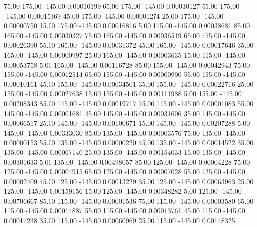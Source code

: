      75.00    175.00   -145.00     0.00016199
     65.00    175.00   -145.00     0.00030127
     55.00    175.00   -145.00     0.00015369
     45.00    175.00   -145.00     0.00001274
     25.00    175.00   -145.00     0.00000750
     15.00    175.00   -145.00     0.00016816
      5.00    175.00   -145.00     0.00038681
     85.00    165.00   -145.00     0.00030327
     75.00    165.00   -145.00     0.00036519
     65.00    165.00   -145.00     0.00026390
     55.00    165.00   -145.00     0.00031372
     45.00    165.00   -145.00     0.00017646
     35.00    165.00   -145.00     0.00000997
     25.00    165.00   -145.00     0.00003635
     15.00    165.00   -145.00     0.00053758
      5.00    165.00   -145.00     0.00116728
     85.00    155.00   -145.00     0.00042943
     75.00    155.00   -145.00     0.00012514
     65.00    155.00   -145.00     0.00000990
     55.00    155.00   -145.00     0.00010161
     45.00    155.00   -145.00     0.00034501
     35.00    155.00   -145.00     0.00022716
     25.00    155.00   -145.00     0.00027638
     15.00    155.00   -145.00     0.00111988
      5.00    155.00   -145.00     0.00208343
     85.00    145.00   -145.00     0.00019717
     75.00    145.00   -145.00     0.00001083
     55.00    145.00   -145.00     0.00001681
     45.00    145.00   -145.00     0.00031606
     35.00    145.00   -145.00     0.00066517
     25.00    145.00   -145.00     0.00100671
     15.00    145.00   -145.00     0.00207288
      5.00    145.00   -145.00     0.00333030
     85.00    135.00   -145.00     0.00003576
     75.00    135.00   -145.00     0.00000153
     55.00    135.00   -145.00     0.00000220
     45.00    135.00   -145.00     0.00014522
     35.00    135.00   -145.00     0.00067140
     25.00    135.00   -145.00     0.00154033
     15.00    135.00   -145.00     0.00301633
      5.00    135.00   -145.00     0.00498057
     85.00    125.00   -145.00     0.00004228
     75.00    125.00   -145.00     0.00004915
     65.00    125.00   -145.00     0.00007028
     55.00    125.00   -145.00     0.00002409
     45.00    125.00   -145.00     0.00013229
     35.00    125.00   -145.00     0.00063963
     25.00    125.00   -145.00     0.00159156
     15.00    125.00   -145.00     0.00348282
      5.00    125.00   -145.00     0.00706667
     85.00    115.00   -145.00     0.00001536
     75.00    115.00   -145.00     0.00003580
     65.00    115.00   -145.00     0.00014887
     55.00    115.00   -145.00     0.00013761
     45.00    115.00   -145.00     0.00017238
     35.00    115.00   -145.00     0.00060969
     25.00    115.00   -145.00     0.00148325
